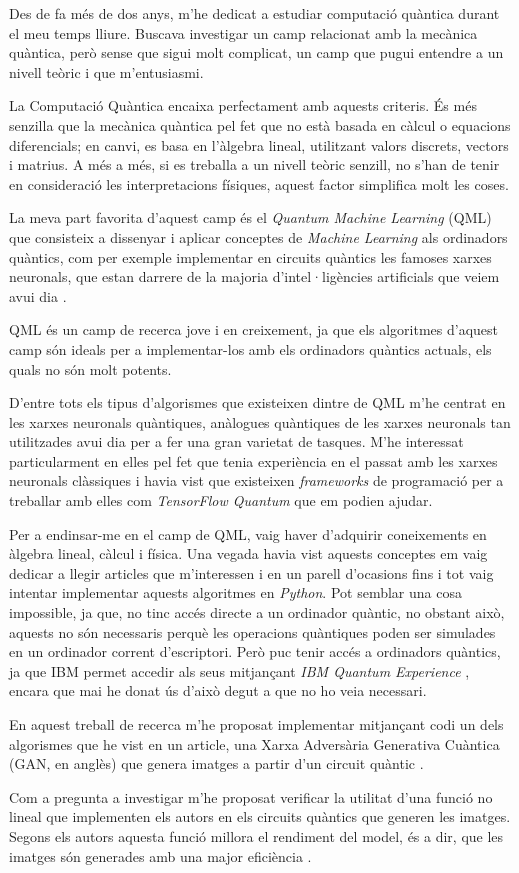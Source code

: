 Des de fa més de dos anys, m'he dedicat a estudiar computació quàntica durant el meu temps lliure. Buscava investigar un camp relacionat amb la mecànica quàntica, però sense que sigui molt complicat, un camp que pugui entendre a un nivell teòric i que m'entusiasmi.

La Computació Quàntica encaixa perfectament amb aquests criteris. És més senzilla que la mecànica quàntica pel fet que no està basada en càlcul o equacions diferencials; en canvi, es basa en l'àlgebra lineal, utilitzant valors discrets, vectors i matrius. A més a més, si es treballa a un nivell teòric senzill, no s'han de tenir en consideració les interpretacions físiques, aquest factor simplifica molt les coses.

La meva part favorita d'aquest camp és el \textit{Quantum Machine Learning} (QML) que consisteix a dissenyar i aplicar conceptes de \textit{Machine Learning} als ordinadors quàntics, com per exemple implementar en circuits quàntics les famoses xarxes neuronals, que estan darrere de la majoria d'intel·ligències artificials que veiem avui dia \cite{schuld:2014}.

QML és un camp de recerca jove i en creixement, ja que els algoritmes d'aquest camp són ideals per a implementar-los amb els ordinadors quàntics actuals, els quals no són molt potents.

D'entre tots els tipus d'algorismes que existeixen dintre de QML m'he centrat en les xarxes neuronals quàntiques, anàlogues quàntiques de les xarxes neuronals tan utilitzades avui dia per a fer una gran varietat de tasques. M'he interessat particularment en elles pel fet que tenia experiència en el passat amb les xarxes neuronals clàssiques i havia vist que existeixen \textit{frameworks} de programació per a treballar amb elles com \textit{TensorFlow Quantum} \cite{tfq} que em podien ajudar.

Per a endinsar-me en el camp de QML, vaig haver d'adquirir coneixements en àlgebra lineal, càlcul i física. Una vegada havia vist aquests conceptes em vaig dedicar a llegir articles que m'interessen i en un parell d'ocasions fins i tot vaig intentar implementar aquests algoritmes en \textit{Python}. Pot semblar una cosa impossible, ja que, no tinc accés directe a un ordinador quàntic, no obstant això, aquests no són necessaris perquè les operacions quàntiques poden ser simulades en un ordinador corrent d'escriptori. Però puc tenir accés a ordinadors quàntics, ja que IBM permet accedir als seus mitjançant \textit{IBM Quantum Experience} \cite{IBM_Q}, encara que mai he donat ús d'això degut a que no ho veia necessari.

En aquest treball de recerca m'he proposat implementar mitjançant codi un dels algorismes que he vist en un article, una Xarxa Adversària Generativa Cuàntica (GAN, en anglès) \cite{GAN2014} que genera imatges a partir d'un circuit quàntic \cite{QGAN_exp}.

Com a pregunta a investigar m'he proposat verificar la utilitat d'una funció no lineal que implementen els autors en els circuits quàntics que generen les imatges. Segons els autors aquesta funció millora el rendiment del model, és a dir, que les imatges són generades amb una major eficiència \cite{QGAN_exp}.


